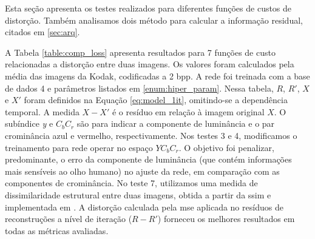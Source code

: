 Esta seção apresenta os testes realizados para diferentes funções de custos de distorção. Também analisamos dois método para calcular a informação residual, citados em \ref{sec:arq}.    


A Tabela \ref{table:comp_loss} apresenta resultados para 7 funções de custo relacionadas a distorção entre duas imagens.  Os valores foram calculados pela média das imagens da Kodak, codificadas a 2 bpp. A rede foi treinada com a base de dados 4 e parâmetros listados em \ref{enum:hiper_param}. Nessa tabela, $R$, $R'$, $X$ e $X'$ foram definidos na Equação \ref{eq:model_1it}, omitindo-se a dependência temporal. A medida $X-X'$ é o resíduo em relação à imagem original  $X$.  
O subíndice \textit{y} e \textit{$C_bC_r$} são para indicar a componente de luminância e o par crominância azul e vermelho, respectivamente. Nos testes 3 e 4, modificamos o treinamento para rede operar no espaço $YC_bC_r$. O objetivo foi penalizar, predominante, o erro da componente de luminância (que contém informações mais sensíveis ao olho humano) no ajuste da rede, em comparação com as componentes de crominância.
No teste 7, utilizamos uma medida de dissimilaridade estrutural entre duas imagens, obtida a partir da \acrshort{ssim} e implementada em \cite{su2017}.  A distorção calculada pela \acrshort{mse} aplicada no resíduos de reconstruções a nível de iteração ($R-R'$) forneceu os melhores resultados em todas as métricas avaliadas. 


